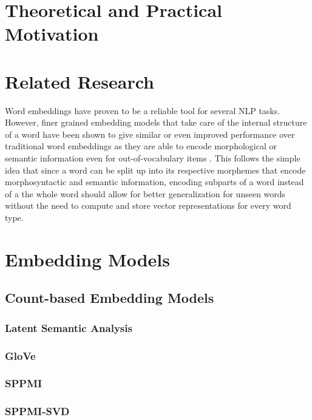 \documentclass[11pt]{article}
\begin{document}
\section{Theoretical and Practical Motivation}
\section{Related Research}
Word embeddings have proven to be a reliable tool for several NLP tasks. However, finer grained embedding models that take care of the internal structure of a word have been shown to give similar or even improved performance over traditional word embeddings as they are able to encode morphological \cite{dos2014learning} or semantic \cite{chen2015joint} information even for out-of-vocabulary items \cite{ling2015finding}. This follows the simple idea that since a word can be split up into its respective morphemes that encode morphosyntactic and semantic information, encoding subparts of a word instead of a the whole word should allow for better generalization for unseen words without the need to compute and store vector representations for every word type. 
\section{Embedding Models}
\subsection{Count-based Embedding Models}
\subsubsection{Latent Semantic Analysis}
\subsubsection{GloVe}
\subsubsection{SPPMI}
\subsubsection{SPPMI-SVD}
\end{document}
